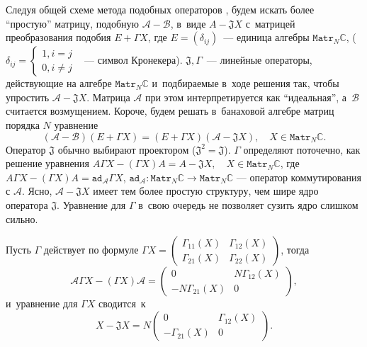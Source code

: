 Следуя общей схеме метода подобных операторов \cite{baskakov-split},
будем искать более ``простую'' матрицу, подобную \( \mathcal{A} - \mathcal{B} \),
в~виде \( A - \mathfrak{J} X \)
с~матрицей преобразования подобия \( E + \Gamma X \),
где \( E = (\delta_{ij}) \)~--- единица алгебры \( \mathtt{Matr}_N\mathbb{C} \),
      (\( \delta_{ij} = \left\{\begin{aligned} 1, i=j \\ 0, i\neq j \end{aligned} \right. \)
         ~--- символ Кронекера).
\( \mathfrak{J},\Gamma \)~--- линейные операторы,
действующие на алгебре \( \mathtt{Matr}_N\mathbb{C} \) и~подбираемые
в~ходе решения так, чтобы упростить \( \mathcal{A} - \mathfrak{J}X \).
Матрица \( \mathcal{A} \) при этом интерпретируется как ``идеальная'',
а~\( \mathcal{B} \) считается возмущением.
Короче, будем решать в~банаховой алгебре матриц порядка \( N \) уравнение
\begin{equation}\label{kozlukovsv:eq:similarity}
    (\mathcal{A-B})(E+\Gamma X) = (E+\Gamma X)(\mathcal{A} - \mathfrak{J} X), \quad X\in\mathtt{Matr}_N\mathbb{C}.
    \end{equation}
Оператор \( \mathfrak{J} \) обычно выбирают проектором (\(\mathfrak{J}^2=\mathfrak{J}\)).
\( \Gamma \) определяют поточечно, как решение уравнения
\( A\Gamma X - (\Gamma X) A = A - \mathfrak{J} X, \quad X\in\mathtt{Matr}_N\mathbb{C} \),
где \( A\Gamma X - (\Gamma X) A = \mathtt{ad}_{\mathcal{A}} \Gamma X \),
\(  \mathtt{ad}_{\mathcal{A}}: \mathtt{Matr}_N\mathbb{C}\to\mathtt{Matr}_N\mathbb{C} \)
--- оператор коммутирования с \( \mathcal{A} \).
Ясно, \( \mathcal{A}-\mathfrak{J}X \) имеет тем более простую структуру,
чем шире ядро оператора \( \mathfrak{J} \).
Уравнение для \( \Gamma \) в~свою очередь не позволяет сузить ядро слишком сильно.

Пусть \( \Gamma \) действует по формуле
\( \Gamma X = \begin{pmatrix} \Gamma_{11}(X) & \Gamma_{12}(X) \\
                              \Gamma_{21}(X) & \Gamma_{22}(X)
                              \end{pmatrix} \), тогда
\[
    \mathcal{A} \Gamma X - (\Gamma X)\mathcal{A} = 
    \begin{pmatrix} 0 & N\Gamma_{12}(X) \\
        - N\Gamma_{21}(X) & 0
        \end{pmatrix}, \]
и~уравнение для \( \Gamma X \) сводится~к
\[
    X - \mathfrak{J} X =
    N \begin{pmatrix} 0 & \Gamma_{12}(X) \\
        - \Gamma_{21}(X) & 0
        \end{pmatrix}.
    \]

